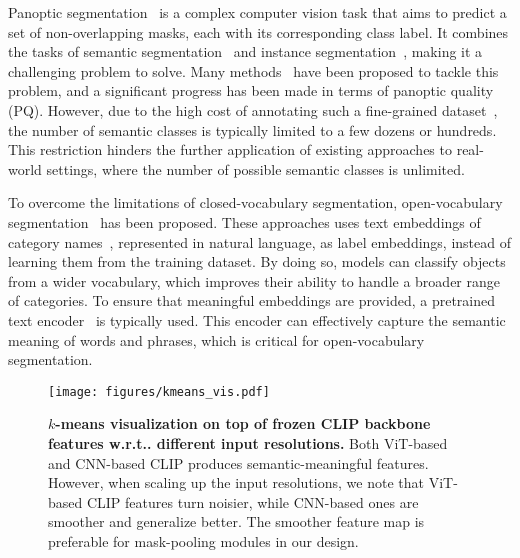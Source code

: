 \documentclass{article}
\makeatletter
\DeclareRobustCommand\onedot{\futurelet\@let@token\@onedot}
\def\@onedot{\ifx\@let@token.\else.\null\fi\xspace}
\def\wrt{w.r.t\onedot}
\makeatother
\begin{document}
Panoptic segmentation~\cite{kirillov2018panoptic} is a complex computer vision task that aims to predict a set of non-overlapping masks, each with its corresponding class label.
It combines the tasks of semantic segmentation~\cite{he2004multiscale} and instance segmentation~\cite{hariharan2014simultaneous}, making it a challenging problem to solve.
Many methods~\cite{kirillov2019panoptic,xiong2019upsnet,cheng2019panoptic,wang2021max,li2021panoptic,yu2022cmt,cheng2021masked,yu2022k,liang2023clustseg} have been proposed to tackle this problem, and a significant progress has been made in terms of panoptic quality (PQ).
However, due to the high cost of annotating such a fine-grained dataset~\cite{lin2014microsoft,Cordts2016Cityscapes}, the number of semantic classes is typically limited to a few dozens or hundreds.
This restriction hinders the further application of existing approaches to real-world settings, where the number of possible semantic classes is unlimited.

To overcome the limitations of closed-vocabulary segmentation, open-vocabulary segmentation~\cite{li2022language,xu2021simple,ghiasi2022scaling,ding2022open} has been proposed. These approaches uses text embeddings of category names~\cite{zareian2021open}, represented in natural language, as label embeddings, instead of learning them from the training dataset.
By doing so, models can classify objects from a wider vocabulary, which improves their ability to handle a broader range of categories.
To ensure that meaningful embeddings are provided, a pretrained text encoder~\cite{devlin2019bert,raffel2020exploring,liu2019roberta,radford2021learning} is typically used. This encoder can effectively capture the semantic meaning of words and phrases, which is critical for open-vocabulary segmentation.

\begin{figure}[!t]
    \centering
    \vspace{-15ex}
    \texttt{[image: figures/kmeans\_vis.pdf]}
    \vspace{-15ex}
    \caption{\textbf{$k$-means visualization on top of frozen CLIP backbone features \wrt different input resolutions.} Both ViT-based and CNN-based CLIP produces semantic-meaningful features. However, when scaling up the input resolutions, we note that ViT-based CLIP features turn noisier, while CNN-based ones are smoother and generalize better. The smoother feature map is preferable for mask-pooling modules in our design.
    }
    \label{fig:kmeans_vis}
\end{figure}
\end{document}
